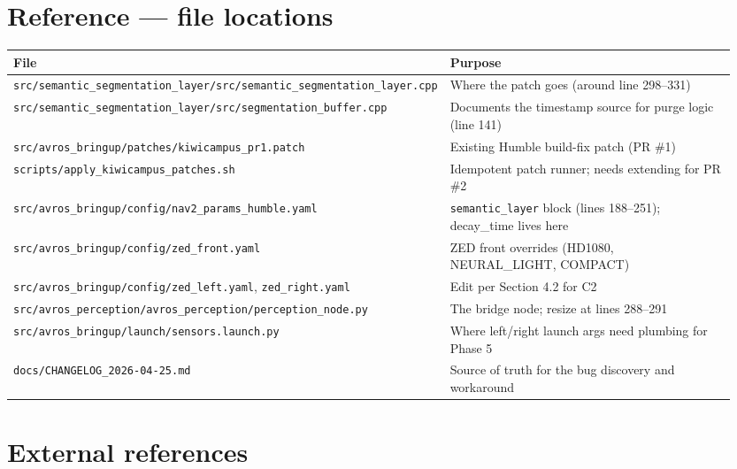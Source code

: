 \documentclass[11pt]{article}
\begin{document}
\section{Reference --- file locations}

\begin{longtable}{p{0.45\linewidth} p{0.50\linewidth}}
\toprule
\textbf{File} & \textbf{Purpose} \\
\midrule
\texttt{src/semantic\_segmentation\_layer/src/semantic\_segmentation\_layer.cpp} & Where the patch goes (around line 298--331) \\
\texttt{src/semantic\_segmentation\_layer/src/segmentation\_buffer.cpp} & Documents the timestamp source for purge logic (line 141) \\
\texttt{src/avros\_bringup/patches/kiwicampus\_pr1.patch} & Existing Humble build-fix patch (PR \#1) \\
\texttt{scripts/apply\_kiwicampus\_patches.sh} & Idempotent patch runner; needs extending for PR \#2 \\
\texttt{src/avros\_bringup/config/nav2\_params\_humble.yaml} & \texttt{semantic\_layer} block (lines 188--251); decay\_time lives here \\
\texttt{src/avros\_bringup/config/zed\_front.yaml} & ZED front overrides (HD1080, NEURAL\_LIGHT, COMPACT) \\
\texttt{src/avros\_bringup/config/zed\_left.yaml}, \texttt{zed\_right.yaml} & Edit per Section 4.2 for C2 \\
\texttt{src/avros\_perception/avros\_perception/perception\_node.py} & The bridge node; resize at lines 288--291 \\
\texttt{src/avros\_bringup/launch/sensors.launch.py} & Where left/right launch args need plumbing for Phase 5 \\
\texttt{docs/CHANGELOG\_2026-04-25.md} & Source of truth for the bug discovery and workaround \\
\bottomrule
\end{longtable}

\section{External references}
\end{document}
